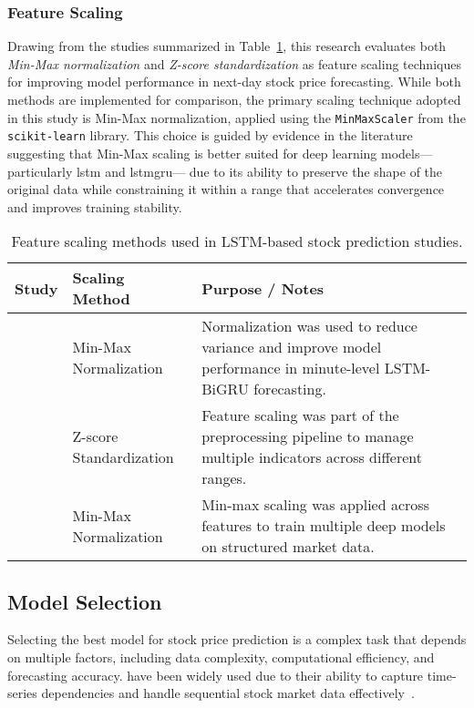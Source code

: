 \subsubsection{Feature Scaling}

Drawing from the studies summarized in Table~\ref{tab:feature-scaling}, this research evaluates both 
\emph{Min-Max normalization} and \emph{Z-score standardization} as feature scaling techniques for improving 
model performance in next-day stock price forecasting. While both methods are implemented for comparison, the 
primary scaling technique adopted in this study is Min-Max normalization, applied using the \texttt{MinMaxScaler} 
from the \texttt{scikit-learn} library. This choice is guided by evidence in the literature suggesting that 
Min-Max scaling is better suited for deep learning models—particularly \acrshort{lstm} and \acrshort{lstmgru}—
due to its ability to preserve the shape of the original data while constraining it within a range that accelerates 
convergence and improves training stability.

\begin{table}[H]
\centering
\caption{Feature scaling methods used in LSTM-based stock prediction studies.}
\label{tab:feature-scaling}
\begin{tabular}{p{3.5cm}p{3.2cm}p{6.8cm}} \hline
\textbf{Study} & \textbf{Scaling Method} & \textbf{Purpose / Notes} \\ \hline\hline
\parencite{shaban2024SMPDL} & Min-Max Normalization & Normalization was used to reduce variance and improve model performance in minute-level LSTM-BiGRU forecasting. \\
\parencite{nabipour2020DeepLearning} & Z-score Standardization & Feature scaling was part of the preprocessing pipeline to manage multiple indicators across different ranges.  \\
\parencite{phuoc2024StockPrediction} & Min-Max Normalization & Min-max scaling was applied across features to train multiple deep models on structured market data.  \\
\hline
\end{tabular}
\end{table}

\subsection{Model Selection}

Selecting the best model for stock price prediction is a complex task that depends on
multiple factors, including data complexity, computational efficiency, and forecasting 
accuracy.  have been widely used due to their ability to capture 
time-series dependencies and handle sequential stock market data 
effectively~\parencite{shaban2024SMPDL}.

